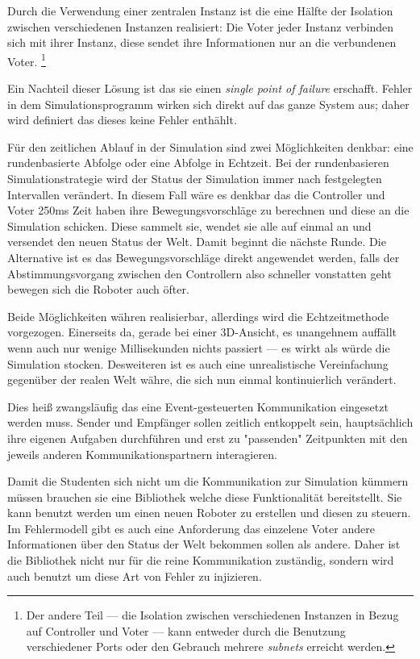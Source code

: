 Durch die Verwendung einer zentralen Instanz ist die eine H{\"{a}}lfte der Isolation zwischen verschiedenen Instanzen realisiert:
Die Voter jeder Instanz verbinden sich mit ihrer Instanz, diese sendet ihre Informationen nur an die verbundenen Voter.
\footnote{Der andere Teil --- die Isolation zwischen verschiedenen Instanzen in Bezug auf Controller und Voter --- kann entweder
durch die Benutzung verschiedener Ports oder den Gebrauch mehrere \textit{subnets} erreicht werden.}

Ein Nachteil dieser L{\"{o}}sung ist das sie einen \textit{single point of failure} erschafft. Fehler in dem Simulationsprogramm
wirken sich direkt auf das ganze System aus; daher wird definiert das dieses keine Fehler enth{\"{a}}hlt.

F{\"{u}}r den zeitlichen Ablauf in der Simulation sind zwei M{\"{o}}glichkeiten denkbar: eine rundenbasierte Abfolge oder eine
Abfolge in Echtzeit. Bei der rundenbasieren Simulationstrategie wird der Status der Simulation immer nach festgelegten Intervallen
ver{\"{a}}ndert. In diesem Fall w{\"{a}}re es denkbar das die Controller und Voter 250ms Zeit haben ihre Bewegungsvorschl{\"{a}}ge
zu berechnen und diese an die Simulation schicken. Diese sammelt sie, wendet sie alle auf einmal an und versendet den neuen Status der
Welt. Damit beginnt die n{\"{a}}chste Runde. Die Alternative ist es das Bewegungsvorschl{\"{a}}ge direkt angewendet werden, falls
der Abstimmungsvorgang zwischen den Controllern also schneller vonstatten geht bewegen sich die Roboter auch {\"{o}}fter.

Beide M{\"{o}}glichkeiten w{\"{a}}hren realisierbar, allerdings wird die Echtzeitmethode vorgezogen. Einerseits da, gerade bei einer
3D-Ansicht, es unangehnem auff{\"{a}}llt wenn auch nur wenige Millisekunden nichts passiert --- es wirkt als w{\"{u}}rde die
Simulation stocken. Desweiteren ist es auch eine unrealistische Vereinfachung gegen{\"{u}}ber der realen Welt w{\"{a}}hre,
die sich nun einmal kontinuierlich ver{\"{a}}ndert.

Dies hei{\ss} zwangsl{\"{a}}ufig das eine Event-gesteuerten Kommunikation eingesetzt werden muss. Sender und Empf{\"{a}}nger
sollen zeitlich entkoppelt sein, haupts{\"{a}}chlich ihre eigenen Aufgaben durchf{\"{u}}hren und erst zu "passenden" Zeitpunkten
mit den jeweils anderen Kommunikationspartnern interagieren. 

Damit die Studenten sich nicht um die Kommunikation zur Simulation k{\"{u}}mmern m{\"{u}}ssen brauchen sie eine Bibliothek welche
diese Funktionalit{\"{a}}t bereitstellt. Sie kann benutzt werden um einen neuen Roboter zu erstellen und diesen zu steuern.
Im Fehlermodell gibt es auch eine Anforderung das einzelene Voter andere Informationen {\"{u}}ber den Status der Welt
bekommen sollen als andere. Daher ist die Bibliothek nicht nur f{\"{u}}r die reine Kommunikation zust{\"{a}}ndig, sondern wird auch
benutzt um diese Art von Fehler zu injizieren.

